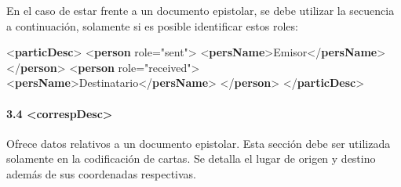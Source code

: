 \documentclass[
]{book}
\newenvironment{Shaded}{\begin{snugshade}}{\end{snugshade}}
\newcommand{\KeywordTok}[1]{\textcolor[rgb]{0.13,0.29,0.53}{\textbf{#1}}}
\newcommand{\NormalTok}[1]{#1}
\newcommand{\OtherTok}[1]{\textcolor[rgb]{0.56,0.35,0.01}{#1}}
\newcommand{\StringTok}[1]{\textcolor[rgb]{0.31,0.60,0.02}{#1}}
\begin{document}
En el caso de estar frente a un documento epistolar, se debe utilizar la secuencia a continuación, solamente si es posible identificar estos roles:

\begin{Shaded}
\begin{Highlighting}[]
\NormalTok{\textless{}}\KeywordTok{particDesc}\NormalTok{\textgreater{} }
\NormalTok{  \textless{}}\KeywordTok{person}\OtherTok{ role=}\StringTok{"sent"}\NormalTok{\textgreater{}}
\NormalTok{    \textless{}}\KeywordTok{persName}\NormalTok{\textgreater{}Emisor\textless{}/}\KeywordTok{persName}\NormalTok{\textgreater{}}
\NormalTok{  \textless{}/}\KeywordTok{person}\NormalTok{\textgreater{}}
\NormalTok{  \textless{}}\KeywordTok{person}\OtherTok{ role=}\StringTok{"received"}\NormalTok{\textgreater{}}
\NormalTok{    \textless{}}\KeywordTok{persName}\NormalTok{\textgreater{}Destinatario\textless{}/}\KeywordTok{persName}\NormalTok{\textgreater{}}
\NormalTok{  \textless{}/}\KeywordTok{person}\NormalTok{\textgreater{}}
\NormalTok{\textless{}/}\KeywordTok{particDesc}\NormalTok{\textgreater{}}
\end{Highlighting}
\end{Shaded}

\hypertarget{correspdesc}{%
\paragraph*{\texorpdfstring{3.4 { \textless correspDesc\textgreater{} }}{3.4  \textless correspDesc\textgreater{} }}\label{correspdesc}}

Ofrece datos relativos a un documento epistolar. Esta sección debe ser utilizada solamente en la codificación de cartas. Se detalla el lugar de origen y destino además de sus coordenadas respectivas.
\end{document}
